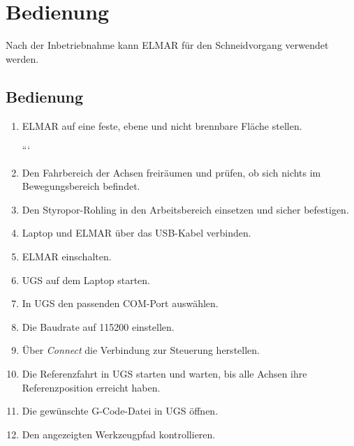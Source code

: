 %
%

\chapter{Bedienung}

Nach der Inbetriebnahme kann ELMAR für den Schneidvorgang verwendet werden.

\section{Bedienung}

\begin{enumerate}
	\item ELMAR auf eine feste, ebene und nicht brennbare Fläche stellen.
	
	```
	\item Den Fahrbereich der Achsen freiräumen und prüfen, ob sich nichts im Bewegungsbereich befindet.
	
	\item Den Styropor-Rohling in den Arbeitsbereich einsetzen und sicher befestigen.
	
	\item Laptop und ELMAR über das USB-Kabel verbinden.
	
	\item ELMAR einschalten.
	
	\item UGS auf dem Laptop starten.
	
	\item In UGS den passenden COM-Port auswählen.
	
	\item Die Baudrate auf 115200 einstellen.
	
	\item Über \textit{Connect} die Verbindung zur Steuerung herstellen.
	
	\item Die Referenzfahrt in UGS starten und warten, bis alle Achsen ihre Referenzposition erreicht haben.
	
	\item Die gewünschte G-Code-Datei in UGS öffnen.
	
	\item Den angezeigten Werkzeugpfad kontrollieren.
	

\end{enumerate}
